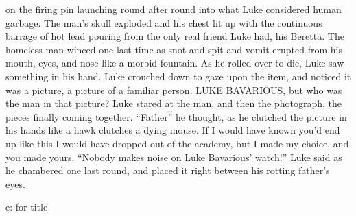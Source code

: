 on the firing pin launching round after round into what Luke
considered human garbage. The man's skull exploded and his
chest lit up with the continuous barrage of hot lead pouring from
the only real friend Luke had, his Beretta. The homeless man winced
one last time as snot and spit and vomit erupted from his mouth,
eyes, and nose like a morbid fountain. As he rolled over to die,
Luke saw something in his hand. Luke crouched down to gaze upon the
item, and noticed it was a picture, a picture of a familiar person.
LUKE BAVARIOUS, but who was the man in that picture? Luke stared at
the man, and then the photograph, the pieces finally coming
together. ``Father'' he thought, as he clutched the
picture in his hands like a hawk clutches a dying mouse. If I would
have known you'd end up like this I would have dropped out of
the academy, but I made my choice, and you made yours.
``Nobody makes noise on Luke Bavarious' watch!''
Luke said as he chambered one last round, and placed it right
between his rotting father's eyes.

e: for title 
 





